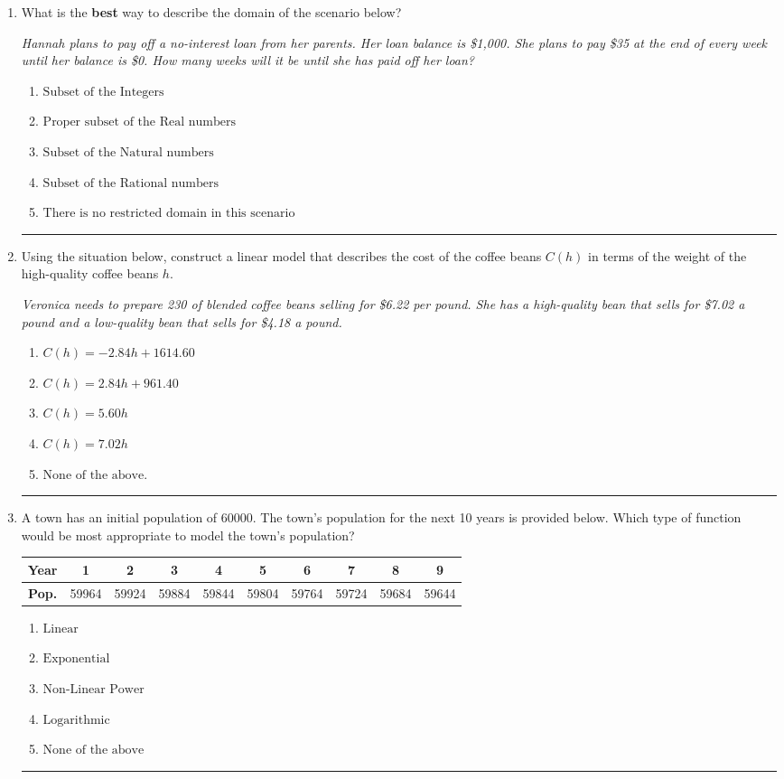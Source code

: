 \documentclass[14pt]{extbook}
\newcommand{\litem}[1]{\item#1\hspace*{-1cm}\rule{\textwidth}{0.4pt}}
\begin{document}
\begin{enumerate}
{\begin{enumerate}[label=\Alph*.]
\end{enumerate} }
\litem{
What is the \textbf{best} way to describe the domain of the scenario below?
\begin{center}
    \textit{ Hannah plans to pay off a no-interest loan from her parents. Her loan balance is \$1,000. She plans to pay \$35 at the end of every week until her balance is \$0. How many weeks will it be until she has paid off her loan? }
\end{center}
\begin{enumerate}[label=\Alph*.]
\item \( \text{Subset of the Integers} \)
\item \( \text{Proper subset of the Real numbers} \)
\item \( \text{Subset of the Natural numbers} \)
\item \( \text{Subset of the Rational numbers} \)
\item \( \text{There is no restricted domain in this scenario} \)

\end{enumerate} }
\litem{
Using the situation below, construct a linear model that describes the cost of the coffee beans $C(h)$ in terms of the weight of the high-quality coffee beans $h$.
\begin{center}
    \textit{ Veronica needs to prepare 230 of blended coffee beans selling for \$6.22 per pound. She has a high-quality bean that sells for \$7.02 a pound and a low-quality bean that sells for \$4.18 a pound. }
\end{center}
\begin{enumerate}[label=\Alph*.]
\item \( C(h) = -2.84 h + 1614.60 \)
\item \( C(h) = 2.84 h + 961.40 \)
\item \( C(h) = 5.60 h \)
\item \( C(h) = 7.02 h \)
\item \( \text{None of the above.} \)

\end{enumerate} }
\litem{
A town has an initial population of 60000. The town's population for the next 10 years is provided below. Which type of function would be most appropriate to model the town's population?


\begin{tabular}{c|c|c|c|c|c|c|c|c|c}
\textbf{Year} & 1 & 2 & 3 & 4 & 5 & 6 & 7 & 8 & 9 \tabularnewline
\hline
\textbf{Pop.} & 59964 & 59924 & 59884 & 59844 & 59804 & 59764 & 59724 & 59684 & 59644
\end{tabular} \begin{enumerate}[label=\Alph*.]
\item \( \text{Linear} \)
\item \( \text{Exponential} \)
\item \( \text{Non-Linear Power} \)
\item \( \text{Logarithmic} \)
\item \( \text{None of the above} \)


\end{enumerate}}
\end{enumerate}
\end{document}
